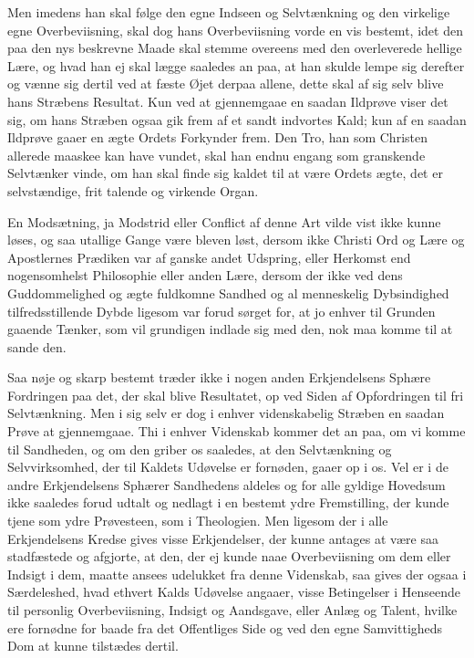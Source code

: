 \documentclass[12pt,a4paper]{book}
\newcommand{\apage}[1]{\marginnote{\footnotesize\textit{[#1]}}}
\begin{document}
Men imedens han skal følge den egne Indseen og Selvtænkning og den virkelige egne
Overbeviisning, skal dog hans Overbeviisning vorde en vis bestemt, idet den paa den
nys beskrevne Maade skal stemme overeens med den overleverede hellige Lære, og
hvad han ej skal lægge saaledes an paa, at han skulde lempe sig derefter og vænne
sig dertil ved at fæste Øjet derpaa allene, dette skal af sig selv blive hans
Stræbens Resultat. \apage{172}  Kun ved at gjennemgaae en saadan Ildprøve viser det sig, om
hans Stræben ogsaa gik frem af et sandt indvortes Kald; kun af en saadan Ildprøve
gaaer en ægte Ordets Forkynder frem. Den Tro, han som Christen allerede maaskee
kan have vundet, skal han endnu engang som granskende Selvtænker vinde, om han
skal finde sig kaldet til at være Ordets ægte, det er selvstændige, frit talende og
virkende Organ.

En Modsætning, ja Modstrid eller Conflict af denne Art vilde vist ikke kunne
løses, og saa utallige Gange være bleven løst, dersom ikke Christi Ord og Lære og
Apostlernes Prædiken var af ganske andet Udspring, eller Herkomst end
nogensomhelst Philosophie eller anden Lære, dersom der ikke ved dens
Guddommelighed og ægte fuldkomne Sandhed og al menneskelig Dybsindighed
tilfredsstillende Dybde ligesom var forud sørget for, at jo enhver til Grunden
gaaende Tænker, som vil grundigen indlade sig med den, nok maa komme til at sande
den.

Saa nøje og skarp bestemt træder ikke i nogen anden Erkjendelsens Sphære
Fordringen paa det, der skal blive Resultatet, op ved Siden af Opfordringen til
fri Selvtænkning. Men i sig selv er dog i enhver videnskabelig Stræben en saadan
Prøve at gjennemgaae. Thi i enhver Videnskab kommer det an paa, om vi komme til
Sandheden, og om den griber os saaledes, at den  \apage{173} Selvtænkning og Selvvirksomhed,
der til Kaldets Udøvelse er fornøden, gaaer op i os. Vel er i de andre
Erkjendelsens Sphærer Sandhedens aldeles og for alle gyldige Hovedsum ikke
saaledes forud udtalt og nedlagt i en bestemt ydre Fremstilling, der kunde tjene
som ydre Prøvesteen, som i Theologien. Men ligesom der i alle Erkjendelsens Kredse
gives visse Erkjendelser, der kunne antages at være saa stadfæstede og afgjorte,
at den, der ej kunde naae Overbeviisning om dem eller Indsigt i dem, maatte ansees
udelukket fra denne Videnskab, saa gives der ogsaa i Særdeleshed, hvad ethvert
Kalds Udøvelse angaaer, visse Betingelser i Henseende til personlig Overbeviisning,
Indsigt og Aandsgave, eller Anlæg og Talent, hvilke ere fornødne for baade fra det
Offentliges Side og ved den egne Samvittigheds Dom at kunne tilstædes dertil.
\end{document}

